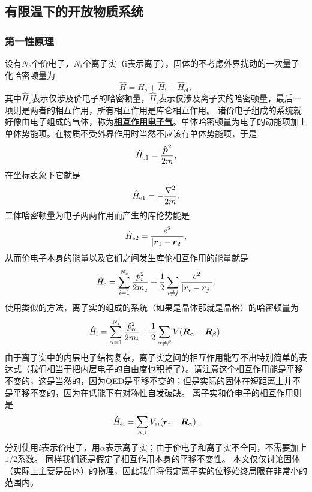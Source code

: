 \documentclass[hyperref, UTF8, a4paper]{ctexart}
\newcommand*{\concept}[1]{\underline{\textbf{#1}}}
\begin{document}
\subsection{有限温下的开放物质系统}

\subsubsection{第一性原理}

设有$N_e$个价电子，$N_i$个离子实（i表示离子），固体的不考虑外界扰动的一次量子化哈密顿量为
\begin{equation}
    \hat{H} = \hat{H}_\text{e} + \hat{H}_\text{i} + \hat{H}_\text{ei},
    \label{eq:many-body-hamiltonian}
\end{equation}
其中$\hat{H}_\text{e}$表示仅涉及价电子的哈密顿量，$\hat{H}_\text{i}$表示仅涉及离子实的哈密顿量，最后一项则是两者的相互作用，所有相互作用是库仑相互作用。
诸价电子组成的系统就好像由电子组成的气体，称为\concept{相互作用电子气}。单体哈密顿量为电子的动能项加上单体势能项。在物质不受外界作用时当然不应该有单体势能项，于是
\[
    \hat{H}_\text{e1} = \frac{\hat{\vb*{p}}^2}{2m},
\]
在坐标表象下它就是
\[
    \hat{H}_\text{e1} = - \frac{\laplacian}{2m}.
\]
二体哈密顿量为电子两两作用而产生的库伦势能是
\[
    \hat{H}_\text{e2} = \frac{e^2}{\abs{\vb*{r}_1 - \vb*{r}_2}},
\]
从而价电子本身的能量以及它们之间发生库伦相互作用的能量就是
\begin{equation}
    \hat{H}_\text{e} = \sum_{i=1}^{N_\text{e}} \frac{\hat{p}_i^2}{2m_\text{e}} + \frac{1}{2} \sum_{i\neq j} \frac{e^2}{\abs{\vb*{r}_i - \vb*{r}_j}}.
\end{equation}
使用类似的方法，离子实的组成的系统（如果是晶体那就是晶格）的哈密顿量为
\begin{equation}
    \hat{H}_\text{i} = \sum_{\alpha=1}^{N_\text{i}} \frac{\hat{p}_\alpha^2}{2m_i} + \frac{1}{2} \sum_{\alpha\neq\beta} V(\vb*{R}_\alpha-\vb*{R}_\beta).
\end{equation}
由于离子实中的内层电子结构复杂，离子实之间的相互作用能写不出特别简单的表达式（我们相当于把内层电子的自由度也积掉了）。请注意这个相互作用能是平移不变的，这是当然的，因为QED是平移不变的；但是实际的固体在短距离上并不是平移不变的，因为在低能下有对称性自发破缺。
离子实和价电子的相互作用则是
\begin{equation}
    \hat{H}_\text{ei} = \sum_{\alpha, i} V_\text{ei}(\vb*{r}_i-\vb*{R}_\alpha). 
\end{equation}
分别使用$i$表示价电子，用$\alpha$表示离子实；由于价电子和离子实不全同，不需要加上$1/2$系数。
同样我们还是假定了相互作用本身的平移不变性。
本文仅仅讨论固体（实际上主要是晶体）的物理，因此我们将假定离子实的位移始终局限在非常小的范围内。
\end{document}

